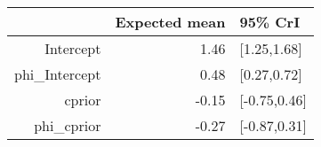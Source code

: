 \begin{tabular}{rrl}
  \hline
 & Expected mean & 95\% CrI \\ 
  \hline
Intercept & 1.46 & [1.25,1.68] \\ 
  phi\_Intercept & 0.48 & [0.27,0.72] \\ 
  cprior & -0.15 & [-0.75,0.46] \\ 
  phi\_cprior & -0.27 & [-0.87,0.31] \\ 
   \hline
\end{tabular}


